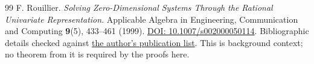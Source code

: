 \begin{thebibliography}{99}
F. Rouillier. \emph{Solving Zero-Dimensional Systems Through the
Rational Univariate Representation}. Applicable Algebra in Engineering,
Communication and Computing \textbf{9}(5), 433--461 (1999).
\href{https://doi.org/10.1007/s002000050114}{DOI: 10.1007/s002000050114}.
Bibliographic details checked against
\href{https://who.rocq.inria.fr/Fabrice.Rouillier/publications.html}{the author's publication list}.
This is background context; no theorem from it is required by the proofs here.
\end{thebibliography}
